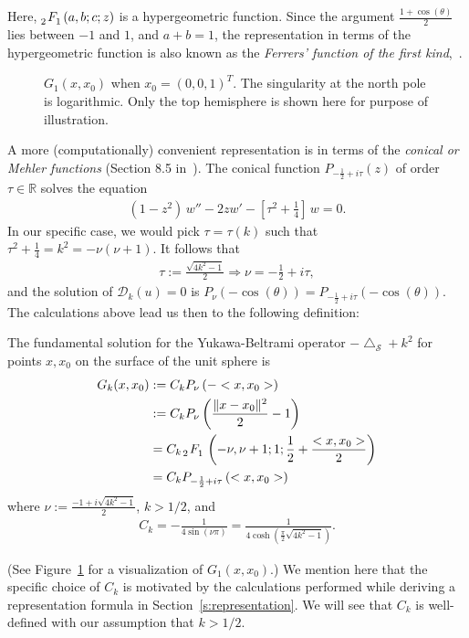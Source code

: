 \documentclass[final]{siamltex}
\newcommand{\lap}{\bigtriangleup}
\newcommand{\C}{C_k}
\renewcommand{\S} {\mathcal{S}}
\begin{document}
Here, $\tensor[_2]{F}{_1}(a,b;c;z)$ is a hypergeometric function. Since
the argument $\frac{1+\cos(\theta)}{2}$ lies between $-1$ and $1$, and
$a+b = 1$, the representation in terms of the hypergeometric function is
also known as the {\it Ferrers' function of the first
kind},~\cite{fatAbramowitz}. 

\begin{figure}
  \centering
  
  \caption{\label{f:greensFun} $G_1(x,x_0)$ when $x_0=(0,0,1)^T$. The
  singularity at the north pole is logarithmic. Only the top hemisphere
  is shown here for purpose of illustration.}
\end{figure}
A more (computationally) convenient representation is in terms of the
{\it conical or Mehler functions} (Section 8.5 in~\cite{lebedev}). The
conical function $P_{-\frac{1}{2}+ i \tau}(z)$ of order $\tau\in \mathbb{R}$ solves
the equation
\begin{align*}
  (1-z^2)\,w'' -2zw' - \left[\tau^2+\frac{1}{4}\right]\,w = 0.
\end{align*}
In our specific case, we would pick $\tau = \tau(k)$ such that
$\tau^2+\frac{1}{4}=k^2 = -\nu(\nu+1).$  It follows that 
\begin{align*}
  \tau:=\frac{\sqrt{4k^2-1}}{2} \Rightarrow  \nu= -\frac{1}{2}+i\tau, 
\end{align*}
and the solution of $\mathcal{D}_k(u)=0$ is $
  P_{\nu} (-\cos(\theta)) = P_{-\frac{1}{2} + i \tau} 
    (-\cos(\theta)).$
The calculations above lead us then to the following definition:

\begin{definition}
\label{fundamentaldef} 
The fundamental solution for the Yukawa-Beltrami operator $-\lap_\S +
k^2$ for points $x,x_0$ on the surface of the unit sphere is 
\begin{subequations}
  \begin{align}
    G_k(x,x_{0})&:=\C P_{\nu}\left(-<x,x_{0}>\right) \nonumber \\
    &:=\C P_{\nu}\left(\frac{\|x-x_{0}\|^2}{2}-1\right) \label{LegP} \\
    &= \C\, \tensor[_2]{F}{_1} \left(-\nu, \nu+1; 1; \frac{1}{2}+
      \frac{<x,x_{0}>}{2}\right)\label{hyperG} \\
    &=\C P_{-\frac{1}{2} + i \tau} \left(<x,x_{0}>\right)\label{conicalP}
  \end{align} 
\end{subequations}
where 
$\nu:=\frac{-1+i\sqrt{4k^2-1}}{2}$, $k>1/2$, and 
\begin{align}
  \label{constant-definition}    
  \C=-\frac{1}{4\sin(\nu\pi)} 
    =\frac{1}{4\cosh(\frac{\pi}{2}\sqrt{4k^2-1})}.
\end{align}
\end{definition} (See
    Figure~\ref{f:greensFun} for a visualization of $G_1(x,x_0)$.)
We mention here that the specific choice of $\C$ is motivated by the
calculations performed while deriving a representation formula in
Section~\ref{s:representation}.  We will see that $\C$ is well-defined
with our assumption that $k>1/2$.
\end{document}
